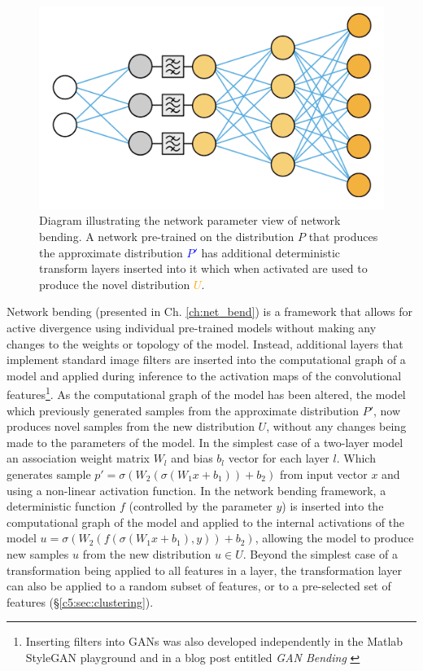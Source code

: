 \begin{figure}[!htbp]
    \centering
    \includegraphics[width=1\textwidth]{figures/c6_active_div/diagrams/network_bending.png}
    \caption[Diagram illustrating the network parameter view of network bending.]{Diagram illustrating the network parameter view of network bending. A network pre-trained on the distribution $P$ that produces the approximate distribution \textcolor{blue}{$P'$} has additional deterministic transform layers inserted into it which when activated are used to produce the novel distribution \textcolor{orange}{$U$}.}
  \label{fig:c6:network-bending}
  \end{figure}

Network bending \citep{broad2021network,broad2022network} (presented in Ch. \ref{ch:net_bend}) is a framework that allows for active divergence using individual pre-trained models without making any changes to the weights or topology of the model. 
Instead, additional layers that implement standard image filters are inserted into the computational graph of a model and applied during inference to the activation maps of the convolutional features\footnote{
    Inserting filters into GANs was also developed independently in the Matlab StyleGAN playground \citep{pinkney2020matlab} and in a blog post entitled \textit{GAN Bending} \citep{pouliot2020gan}}. 
As the computational graph of the model has been altered, the model which previously generated samples from the approximate distribution $P'$, now produces novel samples from the new distribution $U$, without any changes being made to the parameters of the model. 
In the simplest case of a two-layer model an association weight matrix $W_l$ and bias $b_l$ vector for each layer $l$. 
Which generates sample $p'=\sigma(W_2(\sigma(W_1x+b_1))+b_2)$ from input vector $x$ and using a non-linear activation function. 
In the network bending framework, a deterministic function $f$ (controlled by the parameter $y$) is inserted into the computational graph of the model and applied to the internal activations of the model $u=\sigma(W_2(f(\sigma(W_1x+b_1),y))+b_2)$, allowing the model to produce new samples $u$ from the new distribution $u \in U$. Beyond the simplest case of a transformation being applied to all features in a layer, the transformation layer can also be applied to a random subset of features, or to a pre-selected set of features (\S \ref{c5:sec:clustering}). 

